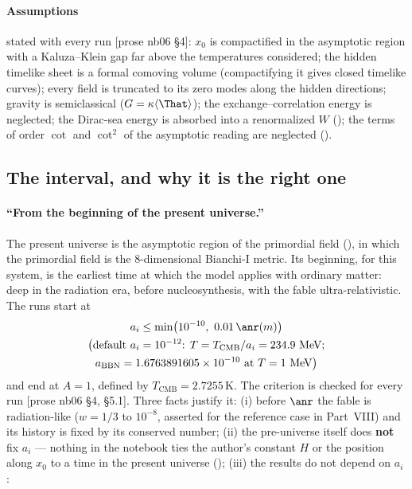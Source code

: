 \paragraph{Assumptions} stated with every run [prose nb06 \S4]: $x_0$ is compactified in the asymptotic
region with a Kaluza--Klein gap far above the temperatures considered; the hidden timelike sheet is a
formal comoving volume (compactifying it gives closed timelike curves); every field is truncated to its zero
modes along the hidden directions; gravity is semiclassical ($G=\kappa\langle\That\rangle$); the
exchange--correlation energy is neglected; the Dirac-sea energy is absorbed into a renormalized $W$
(); the terms of order $\cot$ and $\cot^2$ of the asymptotic reading are neglected
().

\subsection{The interval, and why it is the right one}
\label{sec:9.2}

\paragraph{``From the beginning of the present universe.''} The present universe is the asymptotic region
of the primordial field (), in which the primordial field is the 8-dimensional Bianchi-I
metric. Its beginning, for this system, is the earliest time at which the model applies with ordinary
matter: deep in the radiation era, before nucleosynthesis, with the fable ultra-relativistic. The runs start
at
\begin{gather*}
  a_i\leq\min\bigl(10^{-10},\ 0.01\,\anr(m)\bigr)\\
  \bigl(\text{default } a_i=10^{-12}\text{: } T=T_{\mathrm{CMB}}/a_i=234.9\ \text{MeV};\\
  a_{\mathrm{BBN}}=1.6763891605\times10^{-10}\text{ at } T=1\ \text{MeV}\bigr)
\end{gather*}
and end at $A=1$, defined by $T_{\mathrm{CMB}}=2.7255$\,K. The criterion is checked for every run [prose nb06
\S4, \S5.1]. Three facts justify it: (i) before $\anr$ the fable is radiation-like ($w=1/3$ to $10^{-8}$,
asserted for the reference case in Part~VIII) and its history is fixed by its conserved number; (ii) the
pre-universe itself does \textbf{not} fix $a_i$ --- nothing in the notebook ties the author's constant $H$ or
the position along $x_0$ to a time in the present universe (); (iii) the results do not
depend on $a_i$ :

